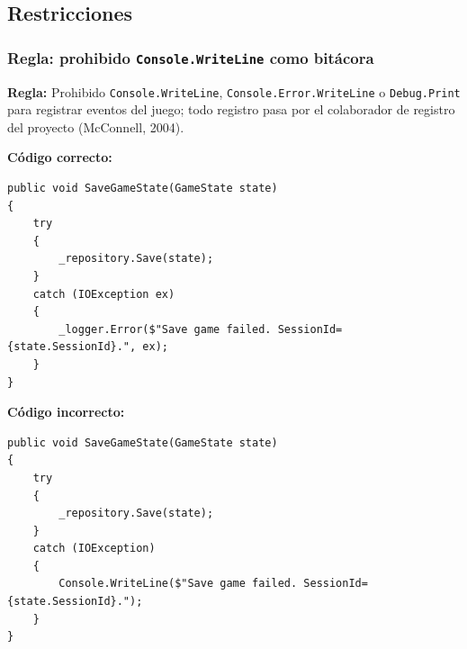 \subsection{Restricciones}

\subsubsection{Regla: prohibido \texttt{Console.WriteLine} como bitácora}

\textbf{Regla:} Prohibido \texttt{Console.WriteLine}, \texttt{Console.Error.WriteLine} o \texttt{Debug.Print} para registrar eventos del juego; todo registro pasa por el colaborador de registro del proyecto (McConnell, 2004).

\textbf{Código correcto:}
\begin{lstlisting}[style=csharpstyle]
public void SaveGameState(GameState state)
{
    try
    {
        _repository.Save(state);
    }
    catch (IOException ex)
    {
        _logger.Error($"Save game failed. SessionId={state.SessionId}.", ex);
    }
}
\end{lstlisting}

\textbf{Código incorrecto:}
\begin{lstlisting}[style=csharpstyle]
public void SaveGameState(GameState state)
{
    try
    {
        _repository.Save(state);
    }
    catch (IOException)
    {
        Console.WriteLine($"Save game failed. SessionId={state.SessionId}.");
    }
}
\end{lstlisting}
